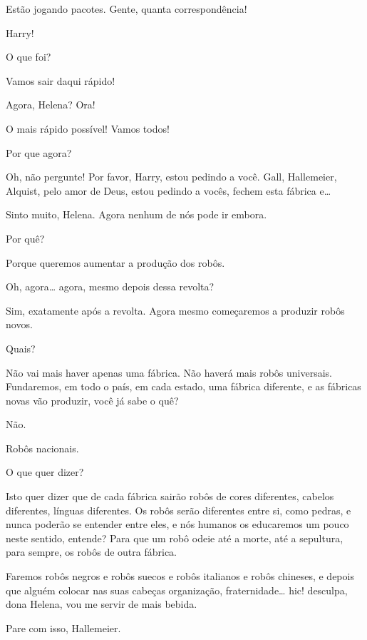   Estão jogando pacotes.  Gente, quanta correspondência!

 Harry!

 O que foi?

 Vamos sair daqui rápido!

 Agora, Helena? Ora!

 O mais rápido possível! Vamos todos!

 Por que agora?

 Oh, não pergunte! Por favor, Harry, estou pedindo a você. Gall,
Hallemeier, Alquist, pelo amor de Deus, estou pedindo a vocês, fechem esta
fábrica e\ldots{}

 Sinto muito, Helena. Agora nenhum de nós pode ir embora.

 Por quê?

 Porque queremos aumentar a produção dos robôs.

 Oh, agora\ldots{} agora, mesmo depois dessa revolta?

 Sim, exatamente após a revolta. Agora mesmo começaremos a produzir robôs
novos.

 Quais?

 Não vai mais haver apenas uma fábrica. Não haverá mais robôs universais.
Fundaremos, em todo o país, em cada estado, uma fábrica diferente, e as fábricas
novas vão produzir, você já sabe o quê?

 Não.

 Robôs nacionais.

 O que quer dizer?

 Isto quer dizer que de cada fábrica sairão robôs de cores diferentes,
cabelos diferentes, línguas diferentes. Os robôs serão diferentes entre si,
como pedras, e nunca poderão se entender entre eles, e nós humanos os
educaremos um pouco neste sentido, entende? Para que um robô odeie até a
morte, até a sepultura, para sempre, os robôs de outra fábrica.

 Faremos robôs negros e robôs suecos e robôs italianos
e robôs chineses, e depois que alguém colocar nas suas cabeças organização,
fraternidade\ldots{}  hic! desculpa, dona Helena, vou me servir
de mais bebida.

 Pare com isso, Hallemeier.

